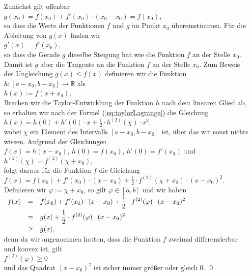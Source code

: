 \proof
Zun\"achst gilt offenbar
\\[0.2cm]
\hspace*{1.3cm}
$g(x_0) = f(x_0) + f'(x_0) \cdot (x_0 - x_0) = f(x_0)$,
\\[0.2cm]
so dass die Werte der Funktionen $f$ und $g$ im Punkt $x_0$ \"ubereinstimmen.  F\"ur die Ableitung von
$g(x)$ finden wir
\\[0.2cm]
\hspace*{1.3cm}
$g'(x) = f'(x_0)$,
\\[0.2cm]
so dass die Gerade $g$ dieselbe Steigung hat wie die Funktion $f$ an der Stelle $x_0$.  Damit ist $g$
aber die Tangente an die Funktion $f$ an der Stelle $x_0$.
Zum Beweis der Ungleichung $g(x) \leq f(x)$ definieren wir die Funktion $h:[a-x_0, b-x_0] \rightarrow \mathbb{R}$ als  
\\[0.2cm]
\hspace*{1.3cm}
$h(x) := f(x + x_0)$.
\\[0.2cm]
Brechen wir die Taylor-Entwicklung der Funktion $h$ nach dem linearen Glied ab, so erhalten wir nach
der Formel (\ref{eq:taylorLagrange}) die Gleichung
\\[0.2cm]
\hspace*{1.3cm}
$h(x) = h(0) + h'(0) \cdot x  + \frac{1}{2} \cdot h^{(2)}(\chi) \cdot x^{2}$, 
\\[0.2cm]
wobei $\chi$ ein Element des Intervalls $[a-x_0, b-x_0]$ ist, \"uber das wir sonst nichts wissen.
Aufgrund der Gleichungen
\\[0.2cm]
\hspace*{1.3cm}
 $f(x) = h(x - x_0)$, \quad $h(0) = f(x_0)$, \quad $h'(0) = f'(x_0)$ 
\quad und \quad $h^{(2)}(\chi) =  f^{(2)}(\chi + x_0)$,
\\[0.2cm]
folgt daraus f\"ur die Funktion $f$ die Gleichung
\\[0.2cm]
\hspace*{1.3cm}
$f(x) = f(x_0) + f'(x_0) \cdot (x - x_0)  + \frac{1}{2} \cdot f^{(2)}(\chi + x_0) \cdot (x- x_0)^{2}$.
\\[0.2cm]
Definieren wir $\varphi := \chi + x_0$, so gilt $\varphi \in [a,b]$ und wir haben
\\[0.2cm]
\hspace*{1.3cm}
$
\begin{array}[t]{lcl}
f(x) &   =  & \displaystyle f(x_0) + f'(x_0) \cdot (x - x_0) + \frac{1}{2} \cdot f^{(2)}(\varphi) \cdot (x-x_0)^{2} \\[0.2cm]
     &   =  & \displaystyle g(x) + \frac{1}{2} \cdot f^{(2)}(\varphi) \cdot (x-x_0)^{2}                             \\[0.2cm]
     & \geq & g(x),                                    
\end{array}
$
\\[0.2cm] 
denn da wir angenommen hatten, dass die Funktion $f$ 
zweimal differenzierbar und konvex ist, gilt
\\[0.2cm]
\hspace*{1.3cm}
$f^{(2)}(\varphi) \geq 0$ 
\\[0.2cm]
und das Quadrat $(x-x_0)^{2}$ ist sicher immer gr\"o{\ss}er oder gleich $0$.  \qed


